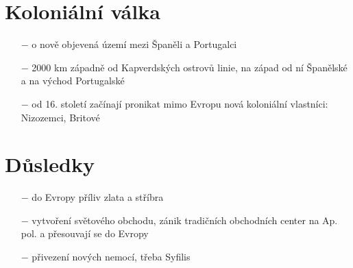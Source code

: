 \documentclass{article}
\begin{document}
\section*{Koloniální válka}
\begin{itemize}
    \vspace{-0.5em}
    \setlength\itemsep{0.15em}
    \item[$-$] o nově objevená území mezi Španěli a Portugalci
    \item[$-$] 2000 km západně od Kapverdských ostrovů linie, na západ od ní Španělské a na východ Portugalské
    \item[$-$] od 16. století začínají pronikat mimo Evropu nová koloniální vlastníci: Nizozemci, Britové
\end{itemize}

\section*{Důsledky}
\begin{itemize}
    \vspace{-0.5em}
    \setlength\itemsep{0.15em}
    \item[$-$] do Evropy příliv zlata a stříbra
    \item[$-$] vytvoření světového obchodu, zánik tradičních obchodních center na Ap. pol. a přesouvají se do Evropy
    \item[$-$] přivezení nových nemocí, třeba Syfilis
\end{itemize}
\end{document}
